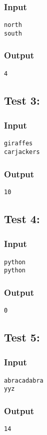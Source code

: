 \documentclass[twocolumn,9pt]{extarticle}
\begin{document}
\subsubsection*{Input}
\texttt{north\\
south}

\subsubsection*{Output}
\texttt{4}

\subsection*{Test 3:}
\subsubsection*{Input}
\texttt{giraffes\\
carjackers}

\subsubsection*{Output}
\texttt{10}

\subsection*{Test 4:}
\subsubsection*{Input}
\texttt{python\\
python}

\subsubsection*{Output}
\texttt{0}

\subsection*{Test 5:}
\subsubsection*{Input}
\texttt{abracadabra\\
yyz}

\subsubsection*{Output}
\texttt{14}
\end{document}
